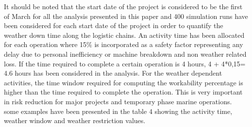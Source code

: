It should be noted that the start date of the project is considered to be the first of March for all the analysis presented in this paper and 400 simulation runs have been considered for each start date of the project in order to quantify the weather down time along the logistic chains. An activity time has been allocated for each operation where 15\%  is incorporated as a safety factor representing any delay due to personal inefficiency or machine breakdown and non weather related loss. If the time required to complete a certain operation is 4 hours, 4 + 4*0,15= 4.6 hours has been considered in the analysis. For the weather dependent activities, the time window required for computing the workability percentage is higher than the time required to complete the operation. This is very important  in risk reduction for major projects and temporary phase marine operations. some examples have been presented in the table 4 showing the activity time, weather window and weather restriction values. 
